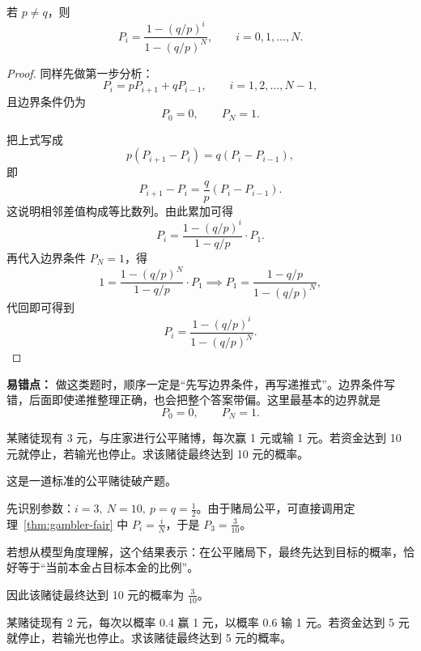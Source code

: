 ﻿\documentclass[lang=cn,11pt]{elegantbook}
\begin{document}
\begin{proposition}[偏置赌局的扩展公式]
若 \(p\neq q\)，则
\[
P_i=\frac{1-(q/p)^i}{1-(q/p)^N},\qquad i=0,1,\dots,N.
\]
\end{proposition}

\begin{proof}
同样先做第一步分析：
\[
P_i=pP_{i+1}+qP_{i-1},\qquad i=1,2,\dots,N-1,
\]
且边界条件仍为
\[
P_0=0,\qquad P_N=1.
\]

把上式写成
\[
p(P_{i+1}-P_i)=q(P_i-P_{i-1}),
\]
即
\[
P_{i+1}-P_i=\frac{q}{p}(P_i-P_{i-1}).
\]
这说明相邻差值构成等比数列。由此累加可得
\[
P_i=\frac{1-(q/p)^i}{1-q/p}\cdot P_1.
\]
再代入边界条件 \(P_N=1\)，得
\[
1=\frac{1-(q/p)^N}{1-q/p}\cdot P_1\implies P_1=\frac{1-q/p}{1-(q/p)^N},
\]
代回即可得到
\[
P_i=\frac{1-(q/p)^i}{1-(q/p)^N}.
\]
\end{proof}

\begin{note}
\textbf{易错点：} 做这类题时，顺序一定是“先写边界条件，再写递推式”。边界条件写错，后面即使递推整理正确，也会把整个答案带偏。这里最基本的边界就是
\[
P_0=0,\qquad P_N=1.
\]
\end{note}

\begin{exercise}[公平赌局中的达标概率]\label{ex:gambler_fair}
某赌徒现有 3 元，与庄家进行公平赌博，每次赢 1 元或输 1 元。若资金达到 10 元就停止，若输光也停止。求该赌徒最终达到 10 元的概率。
\end{exercise}

\begin{solution}
这是一道标准的公平赌徒破产题。

先识别参数：\(i=3,\ N=10,\ p=q=\frac12\)。由于赌局公平，可直接调用定理~\ref{thm:gambler-fair} 中 \(P_i=\frac{i}{N}\)，于是 \(P_3=\frac{3}{10}\)。

若想从模型角度理解，这个结果表示：在公平赌局下，最终先达到目标的概率，恰好等于“当前本金占目标本金的比例”。

因此该赌徒最终达到 10 元的概率为 \(\frac{3}{10}\)。
\end{solution}

\begin{exercise}[偏置赌局中的达标概率]\label{ex:gambler_bias}
某赌徒现有 2 元，每次以概率 0.4 赢 1 元，以概率 0.6 输 1 元。若资金达到 5 元就停止，若输光也停止。求该赌徒最终达到 5 元的概率。
\end{exercise}
\end{document}
